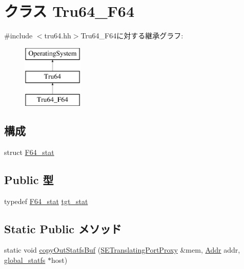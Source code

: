 \hypertarget{classTru64__F64}{
\section{クラス Tru64\_\-F64}
\label{classTru64__F64}
}


{\ttfamily \#include $<$tru64.hh$>$}Tru64\_\-F64に対する継承グラフ:\begin{figure}[H]
\begin{center}
\leavevmode
\includegraphics[height=3cm]{classTru64__F64}
\end{center}
\end{figure}
\subsection*{構成}
\begin{DoxyCompactItemize}
\item 
struct \hyperlink{structTru64__F64_1_1F64__stat}{F64\_\-stat}
\end{DoxyCompactItemize}
\subsection*{Public 型}
\begin{DoxyCompactItemize}
\item 
typedef \hyperlink{structTru64__F64_1_1F64__stat}{F64\_\-stat} \hyperlink{classTru64__F64_ae57fa534da0197e5bb73fbc40bd59a08}{tgt\_\-stat}
\end{DoxyCompactItemize}
\subsection*{Static Public メソッド}
\begin{DoxyCompactItemize}
\item 
static void \hyperlink{classTru64__F64_ab39f4973592abe61638b8b998bc5691d}{copyOutStatfsBuf} (\hyperlink{classSETranslatingPortProxy}{SETranslatingPortProxy} \&mem, \hyperlink{base_2types_8hh_af1bb03d6a4ee096394a6749f0a169232}{Addr} addr, \hyperlink{kern_2tru64_2tru64_8hh_a1a8529336c3f2704cb49ee2cd97412a8}{global\_\-statfs} $\ast$host)
\end{DoxyCompactItemize}


